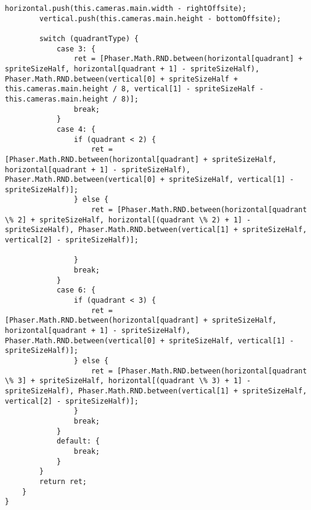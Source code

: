 \begin{lstlisting}[style=TypeScript, caption={sortingScene.ts}]
        horizontal.push(this.cameras.main.width - rightOffsite);
        vertical.push(this.cameras.main.height - bottomOffsite);

        switch (quadrantType) {
            case 3: {
                ret = [Phaser.Math.RND.between(horizontal[quadrant] + spriteSizeHalf, horizontal[quadrant + 1] - spriteSizeHalf), Phaser.Math.RND.between(vertical[0] + spriteSizeHalf + this.cameras.main.height / 8, vertical[1] - spriteSizeHalf - this.cameras.main.height / 8)];
                break;
            }
            case 4: {
                if (quadrant < 2) {
                    ret = [Phaser.Math.RND.between(horizontal[quadrant] + spriteSizeHalf, horizontal[quadrant + 1] - spriteSizeHalf), Phaser.Math.RND.between(vertical[0] + spriteSizeHalf, vertical[1] - spriteSizeHalf)];
                } else {
                    ret = [Phaser.Math.RND.between(horizontal[quadrant \% 2] + spriteSizeHalf, horizontal[(quadrant \% 2) + 1] - spriteSizeHalf), Phaser.Math.RND.between(vertical[1] + spriteSizeHalf, vertical[2] - spriteSizeHalf)];

                }
                break;
            }
            case 6: {
                if (quadrant < 3) {
                    ret = [Phaser.Math.RND.between(horizontal[quadrant] + spriteSizeHalf, horizontal[quadrant + 1] - spriteSizeHalf), Phaser.Math.RND.between(vertical[0] + spriteSizeHalf, vertical[1] - spriteSizeHalf)];
                } else {
                    ret = [Phaser.Math.RND.between(horizontal[quadrant \% 3] + spriteSizeHalf, horizontal[(quadrant \% 3) + 1] - spriteSizeHalf), Phaser.Math.RND.between(vertical[1] + spriteSizeHalf, vertical[2] - spriteSizeHalf)];
                }
                break;
            }
            default: {
                break;
            }
        }
        return ret;
    }
}
\end{lstlisting}

